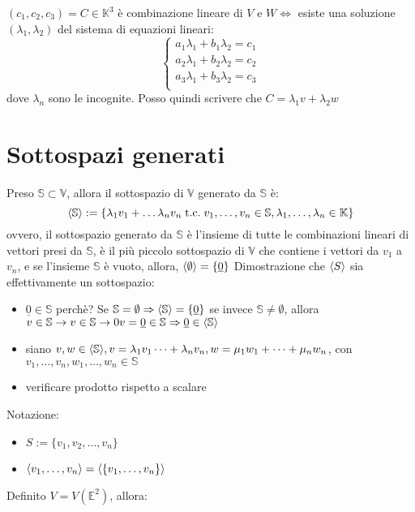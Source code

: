 \documentclass[a4paper,12pt]{article}
\begin{document}
	$(c_1, c_2, c_3) = C \in \mathbb{K}^3$ è combinazione lineare di $V$ e $W \iff $ esiste una soluzione $(\lambda_1, \lambda_2)$ del sistema di equazioni lineari:
	\[
	\left\{
	\begin{array}{l}
		a_1\lambda_1 + b_1\lambda_2 = c_1 \\
		a_2\lambda_1 + b_2\lambda_2 = c_2 \\
		a_3\lambda_1 + b_3\lambda_2 = c_3 \\
	\end{array}
	\right.
	\]
	dove $\lambda_n$ sono le incognite. Posso quindi scrivere che $C = \lambda_1 v + \lambda_2 w$
	
	\section{Sottospazi generati}
	Preso $\mathbb{S} \subset \mathbb{V}$, allora il sottospazio di $\mathbb{V}$ generato da $\mathbb{S}$ è:
	\[\langle \mathbb{S} \rangle := \{\lambda_1 v_1 + \dots \lambda_n v_n \;\text{t.c.}\; v_1, \dots, v_n \in \mathbb{S}, \lambda_1, \dots, \lambda_n \in \mathbb{K}\}\]
	ovvero, il sottospazio generato da $\mathbb{S}$ è l'insieme di tutte le combinazioni lineari di vettori presi da $\mathbb{S}$, è il più piccolo sottospazio di $\mathbb{V}$ che contiene i vettori da $v_1$ a $v_n$, e se l'insieme $\mathbb{S}$ è vuoto, allora, $\langle \emptyset \rangle = \{\underline{0}\}$ \newline
	Dimostrazione che $\langle S \rangle$ sia effettivamente un sottospazio:
	\begin{itemize}
		\item $\underline{0} \in \mathbb{S}$ perchè? 
			\subitem Se $\mathbb{S} = \emptyset \Rightarrow \langle \mathbb{S} \rangle = \{\underline{0}\}$
			\subitem se invece $\mathbb{S} \not = \emptyset$, allora $v \in \mathbb{S} \rightarrow v \in \mathbb{S} \rightarrow 0v = \underline{0} \in \mathbb{S} \Rightarrow \underline{0} \in \langle \mathbb{S} \rangle$
		\item siano $v, w \in \langle \mathbb{S} \rangle, v = \lambda_1 v_1 \dots + \lambda_n v_n, w = \mu_1 w_1 + \dots + \mu_n w_n$, con $v_1, \dots, v_n, w_1, \dots, w_n \in \mathbb{S}$
		\item verificare prodotto rispetto a scalare
	\end{itemize}
	Notazione:
	\begin{itemize}
		\item $S := \{v_1, v_2, \dots, v_n\}$
		\item $\langle v_1, \dots, v_n \rangle = \langle \{v_1, \dots, v_n\} \rangle$
	\end{itemize}
	Definito $V = V(\mathbb{E}^2)$, allora:
	
\end{document}
